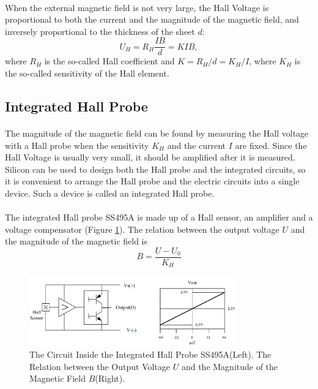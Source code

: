 \documentclass[a4paper]{article}
\begin{document}
    \paragraph{} When the external magnetic field is not very large, the Hall Voltage is proportional to both the current and the magnitude of the magnetic field, and inversely proportional to the thickness of the sheet $d$: 
    \begin{equation}
        U_H=R_H\frac{IB}{d}=KIB,
        \label{eqn:Halleffect}
    \end{equation}
    where $R_H$ is the so-called Hall coefficient and $K=R_H/d=K_H/I$, where $K_H$ is the so-called sensitivity of the Hall element. 
    \subsection{Integrated Hall Probe}
    \paragraph{} The magnitude of the magnetic field can be found by measuring the Hall voltage with a Hall probe when the sensitivity $K_H$ and the current $I$ are fixed. Since the Hall Voltage  is usually very small, it should be amplified after it is measured. Silicon can be used to design both the Hall probe and the integrated circuits, so it is convenient to arrange the Hall probe and the electric circuits into a single device. Such a device is called an integrated Hall probe.
    \vspace{-5mm}
    \paragraph{} The integrated Hall probe SS495A is made up of a Hall sensor, an amplifier and a voltage compensator (Figure \ref{fig:hallprobe}). The relation between the output voltage $U$ and the magnitude of the magnetic field is 
    \begin{equation}
        B=\frac{U-U_0}{K_H}\label{eqn:hallprobe}
    \end{equation}
    \begin{figure}[!ht]
        \centering
        \includegraphics[width=0.8\textwidth]{fig/hallprobe.png}
        \caption{The Circuit Inside the Integrated Hall Probe SS495A(Left). The Relation between the Output Voltage $U$ and the Magnitude of the Magnetic Field $B$(Right).}
        \label{fig:hallprobe}
    \end{figure}
\end{document}
